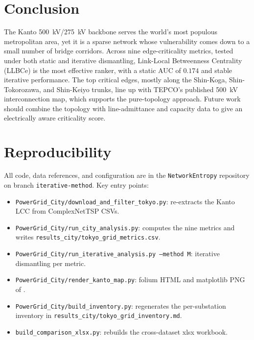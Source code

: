 \documentclass[11pt,a4paper]{article}
\begin{document}
\section{Conclusion}
\label{sec:conclusion}

The Kanto \SI{500}{\kilo\volt}/\SI{275}{\kilo\volt} backbone serves the
world's most populous metropolitan area, yet it is a sparse network whose
vulnerability comes down to a small number of bridge corridors. Across
nine edge-criticality metrics, tested under both static and iterative
dismantling, Link-Local Betweenness Centrality (LLBCe) is the most
effective ranker, with a static AUC of $0.174$ and stable iterative
performance. The top critical edges, mostly along the Shin-Koga,
Shin-Tokorozawa, and Shin-Keiyo trunks, line up with TEPCO's published
\SI{500}{\kilo\volt} interconnection map, which supports the
pure-topology approach. Future work should combine the topology with
line-admittance and capacity data to give an electrically aware
criticality score.

\section*{Reproducibility}

All code, data references, and configuration are in the
\texttt{NetworkEntropy} repository on branch \texttt{iterative-method}.
Key entry points:
\begin{itemize}
\raggedright
\item \texttt{PowerGrid\_City/\allowbreak download\_and\_filter\_tokyo.py}:
re-extracts the Kanto LCC from ComplexNetTSP CSVs.
\item \texttt{PowerGrid\_City/\allowbreak run\_city\_analysis.py}: computes the
nine metrics and writes
\texttt{results\_city/\allowbreak tokyo\_grid\_metrics.csv}.
\item \texttt{PowerGrid\_City/\allowbreak run\_iterative\_analysis.py
--method M}: iterative dismantling per metric.
\item \texttt{PowerGrid\_City/\allowbreak render\_kanto\_map.py}: folium HTML
and matplotlib PNG of .
\item \texttt{PowerGrid\_City/\allowbreak build\_inventory.py}: regenerates
the per-substation inventory in
\texttt{results\_city/\allowbreak tokyo\_grid\_inventory.md}.
\item \texttt{build\_comparison\_xlsx.py}: rebuilds the
cross-dataset xlsx workbook.
\end{itemize}
\end{document}
